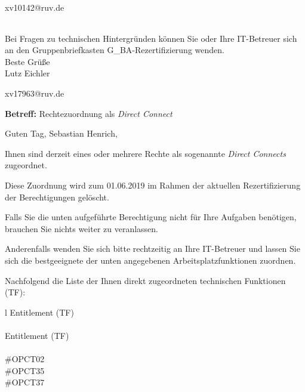 \documentclass[a4paper,landscape,12pt]{letter}
\begin{document}
\begin{letter}{xv10142@ruv.de\hfill \break}
\begin{tiny}
\begin{longtable}{|p{35mm}|p{15mm}|p{25mm}|p{10mm}|p{40mm}|p{50mm}|p{50mm}|}
\hline
		\end{longtable}
		\end{tiny}
	
\begin{minipage}{\textwidth}
			Bei Fragen zu technischen Hintergründen können Sie 
			oder Ihre IT-Betreuer sich an den Gruppenbriefkasten 
			G\_BA-Rezertifizierung
			wenden.\\
			\linebreak
			Beste Grüße\\
			Lutz Eichler
	\end{minipage}
	\end{letter}
	
\begin{letter}{xv17963@ruv.de\hfill \break}
\begin{normalsize}
	\opening{\textbf{Betreff:} Rechtezuordnung als \emph{Direct Connect}}
	\begin{normalsize} \hfill
	\end{normalsize}

	\begin{normalsize}
		Guten Tag, 
	Sebastian Henrich, \hfill \break
	\end{normalsize}
	\end{normalsize}
	
\begin{normalsize}
	Ihnen sind derzeit eines oder mehrere Rechte als sogenannte \emph{Direct Connects} zugeordnet.
	
	Diese Zuordnung wird zum 01.06.2019 im Rahmen der aktuellen Rezertifizierung der Berechtigungen gelöscht.
	
	Falls Sie die unten aufgeführte Berechtigung nicht für Ihre Aufgaben benötigen, 
	brauchen Sie nichts weiter zu veranlassen.
	
	Anderenfalls wenden Sie sich bitte rechtzeitig an Ihre IT-Betreuer 
	und lassen Sie sich die bestgeeignete der unten angegebenen Arbeitsplatzfunktionen zuordnen.
	\end{normalsize}
	
\begin{normalsize}
	Nachfolgend die Liste der Ihnen direkt zugeordneten technischen Funktionen (TF):

	\begin{longtable}{l}
		Entitlement (TF) \\ \hline
		\endfirsthead
		\\\hline
		Entitlement (TF) \\ \hline
		\endhead %
		\multicolumn{1}{r@{}}{Fortsetzung \ldots}\\
		\endfoot
		\hline
		\endlastfoot
	\#OPCT02\\\#OPCT35\\\#OPCT37\\
	\end{longtable}
	\end{normalsize}
	

\end{letter}
\end{document}
